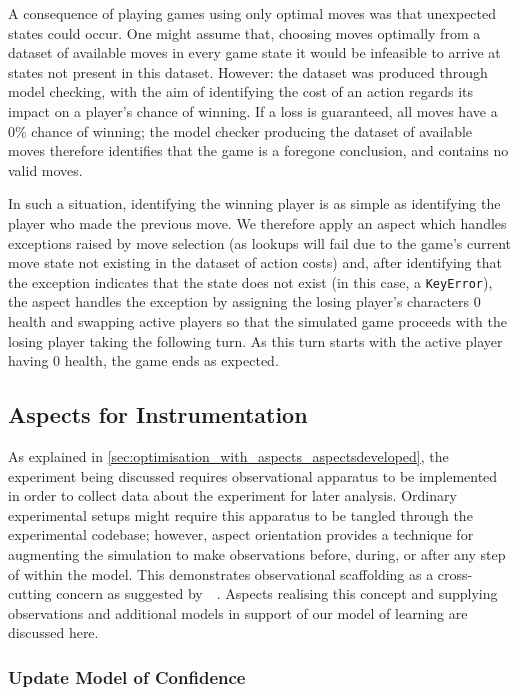 A consequence of playing games using only optimal moves was that unexpected
states could occur. One might assume that, choosing moves optimally from a
dataset of available moves in every game state it would be infeasible to arrive
at states not present in this dataset. However: the dataset was produced through
model checking, with the aim of identifying the cost of an action regards its
impact on a player's chance of winning. If a loss is guaranteed, all moves have
a 0\% chance of winning; the model checker producing the dataset of available
moves therefore identifies that the game is a foregone conclusion, and contains
no valid moves. 

In such a situation, identifying the winning player is as simple as identifying
the player who made the previous move. We therefore apply an aspect which handles
exceptions raised by move selection (as lookups will fail due to the game's current
move state not existing in the dataset of action costs) and, after identifying that
the exception indicates that the state does not exist (in this case, a 
\lstinline{KeyError}), the aspect handles the exception by assigning the losing player's
characters 0 health and swapping active players so that the simulated game proceeds with
the losing player taking the following turn. As this turn starts with the active player
having 0 health, the game ends as expected.


\subsection{Aspects for Instrumentation}\label{subsec:aspects_instrumenting_model}

As explained in \cref{sec:optimisation_with_aspects_aspectsdeveloped}, the experiment
being discussed requires observational apparatus to be implemented in order to
collect data about the experiment for later analysis. Ordinary experimental setups
might require this apparatus to be tangled through the experimental codebase; however,
aspect orientation provides a technique for augmenting the simulation to make observations
before, during, or after any step of within the model. This demonstrates observational
scaffolding as a cross-cutting concern as suggested by~\citeauthor{gulyas1999use}~\cite{gulyas1999use}.
Aspects realising this concept and supplying observations and additional models in support of our
model of learning are discussed here.


\subsubsection{Update Model of Confidence}

